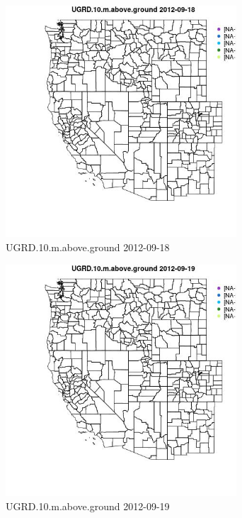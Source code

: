 \begin{figure} 
\centering  
\includegraphics[width=0.77\textwidth]{Code_Outputs/ML_input_report_ML_input_PM25_Step5_part_d_de_duplicated_aves_ML_input_MapObsUGRD10maboveground2012-09-18.jpg} 
\caption{\label{fig:ML_input_report_ML_input_PM25_Step5_part_d_de_duplicated_aves_ML_inputMapObsUGRD10maboveground2012-09-18}UGRD.10.m.above.ground 2012-09-18} 
\end{figure} 
 

\begin{figure} 
\centering  
\includegraphics[width=0.77\textwidth]{Code_Outputs/ML_input_report_ML_input_PM25_Step5_part_d_de_duplicated_aves_ML_input_MapObsUGRD10maboveground2012-09-19.jpg} 
\caption{\label{fig:ML_input_report_ML_input_PM25_Step5_part_d_de_duplicated_aves_ML_inputMapObsUGRD10maboveground2012-09-19}UGRD.10.m.above.ground 2012-09-19} 
\end{figure} 
 

